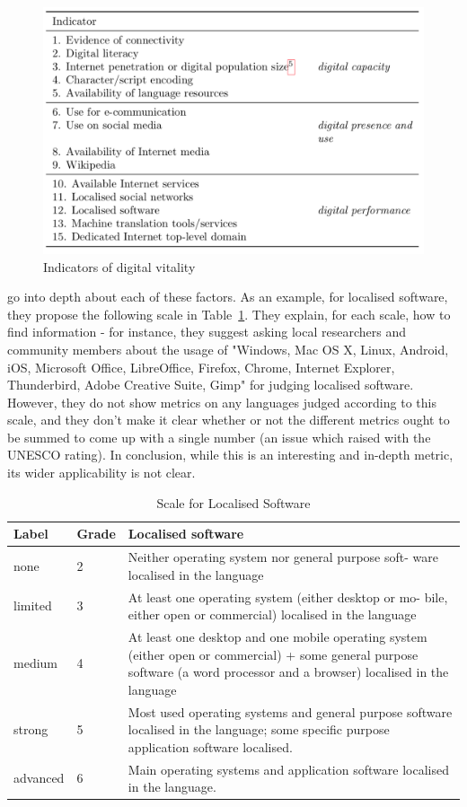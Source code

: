 \begin{figure}
 \centering
 \includegraphics[width=.8\textwidth]{img/dldp.png}
 \caption{Indicators of digital vitality \citep[6]{soria2017digital}}
 \label{fig:dldp}
\end{figure}

\citet{soria2017digital} go into depth about each of these factors. As an example, for localised software, they propose the following scale in Table~\ref{table:dldp-software}. They explain, for each scale, how to find information - for instance, they suggest asking local researchers and community members about the usage of "Windows, Mac OS X, Linux, Android, iOS, Microsoft Office, LibreOffice, Firefox, Chrome, Internet Explorer, Thunderbird, Adobe Creative Suite, Gimp" for judging localised software. However, they do not show metrics on any languages judged according to this scale, and they don't make it clear whether or not the different metrics ought to be summed to come up with a single number (an issue which \citet{lee2016assessing} raised with the UNESCO rating). In conclusion, while this is an interesting and in-depth metric, its wider applicability is not clear.

\begin{table}
\begin{center}
\begin{tabular}{|p{2cm}|p{1cm}|p{10cm}|} \hline
Label & Grade & Localised software \\ \hline
none & 2 & Neither operating system nor general purpose soft- ware localised in the language\\
limited & 3 & At least one operating system (either desktop or mo- bile, either open or commercial) localised in the language \\
medium & 4 & At least one desktop and one mobile operating system (either open or commercial) + some general purpose software (a word processor and a browser) localised in the language\\
strong & 5 & Most used operating systems and general purpose software localised in the language; some specific purpose application software localised.\\
advanced & 6 & Main operating systems and application software localised in the language.  \\ \hline
\end{tabular}
\end{center}
\caption{Scale for Localised Software \citep[21]{soria2017digital}}
\label{table:dldp-software}
\end{table}

